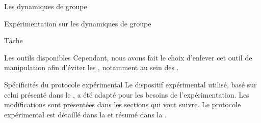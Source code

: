 \documentclass[myfrancais]{mythesis}
\begin{document}
\begin{mychapter}{Les dynamiques de groupe}
\begin{mysection}{Expérimentation sur les dynamiques de groupe}
\begin{mysubsection}{Tâche}
\begin{mysubsubsection}{Les outils disponibles}
					Cependant, nous avons fait le choix d'enlever cet outil de manipulation afin d'éviter les , notamment au sein des .
				\end{mysubsubsection}
			\end{mysubsection}
			\begin{mysubsection}{Spécificités du protocole expérimental}
				Le dispositif expérimental utilisé, basé sur celui présenté dans le , a été adapté pour les besoins de l'expérimentation.
				Les modifications sont présentées dans les sections qui vont suivre.
				Le protocole expérimental est détaillé dans la  et résumé dans la .


\end{mysubsection}
\end{mysection}
\end{mychapter}
\end{document}
